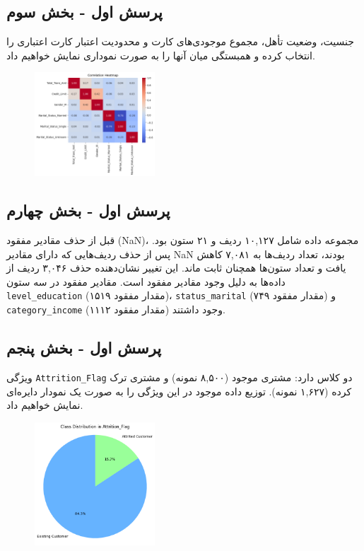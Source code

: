 \documentclass{article}
\begin{document}
\subsection{پرسش اول - بخش سوم}
جنسیت، وضعیت تأهل، مجموع موجودی‌های کارت و محدودیت اعتبار کارت اعتباری را انتخاب کرده و همبستگی میان آنها را به صورت نموداری نمایش خواهیم داد.

\begin{figure}[!h]
    \centering
    \includegraphics[width=0.4\textwidth]{img/2.png}
\end{figure}

\subsection{پرسش اول - بخش چهارم}
قبل از حذف مقادیر مفقود (NaN)، مجموعه داده شامل ۱۰,۱۲۷ ردیف و ۲۱ ستون بود. پس از حذف ردیف‌هایی که دارای مقادیر NaN بودند، تعداد ردیف‌ها به ۷,۰۸۱ کاهش یافت و تعداد ستون‌ها همچنان ثابت ماند. این تغییر نشان‌دهنده حذف ۳,۰۴۶ ردیف از داده‌ها به دلیل وجود مقادیر مفقود است. مقادیر مفقود در سه ستون \texttt{level\_education} (۱۵۱۹ مقدار مفقود)، \texttt{status\_marital} (۷۴۹ مقدار مفقود) و \texttt{category\_income} (۱۱۱۲ مقدار مفقود) وجود داشتند.

\subsection{پرسش اول - بخش پنجم}
ویژگی \texttt{Attrition\_Flag} دو کلاس دارد: مشتری موجود (۸,۵۰۰ نمونه) و مشتری ترک کرده (۱,۶۲۷ نمونه). توزیع داده موجود در این ویژگی را به صورت یک نمودار دایره‌ای نمایش خواهیم داد.

\begin{figure}[!h]
    \centering
    \includegraphics[width=0.4\textwidth]{img/3.png}
\end{figure}
\end{document}
